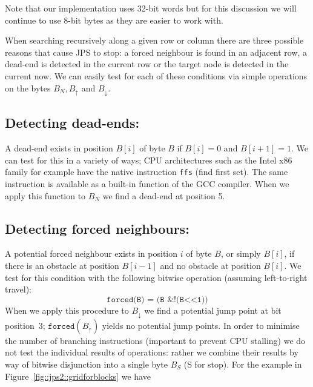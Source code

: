 \noindent Note that our implementation uses 32-bit words but for this discussion
we will continue to use 8-bit bytes as they are easier to work with.  

When searching recursively along a given row or column
there are three possible reasons that cause JPS to stop: 
a forced neighbour is found in an adjacent row, a dead-end is 
detected in the current row or the target node is detected in the
current now.
We can easily test for each of these conditions via simple
operations on the bytes $B_{N}, B_{\uparrow}$ and $B_{\downarrow}$.

\subsection*{Detecting dead-ends:}
A dead-end exists in position $B[i]$ of byte $B$ if $B[i] = 0$ and 
$B[i+1] = 1$. We can test for this in a variety of ways;
CPU architectures such as the Intel x86 family for example have the native 
instruction \texttt{ffs} (find first set). The same instruction is available as
a built-in function of the \textsc{GCC} compiler. When we apply
this function to $B_{N}$ we find a dead-end at position 5.

\subsection*{Detecting forced neighbours:}
A potential forced neighbour exists in position $i$ of byte $B$, or simply 
$B[i]$, if there is an obstacle at position $B[i-1]$ 
and no obstacle at position $B[i]$. We test for this condition with the
following bitwise operation (assuming left-to-right travel):
\begin{equation}
\texttt{forced(B) = (B\ \& !(B<<1))}
\end{equation}
When we apply this procedure to $B_{\downarrow}$ we find a potential jump 
point at bit position~$3$; $\texttt{forced}(B_{\uparrow})$ yields no potential jump points.
In order to minimise the number of branching instructions (important
to prevent CPU stalling) we do not test the individual results of 
operations: rather we combine their results by way
of bitwise disjunction into a single byte $B_{S}$ (S for stop).
For the example in Figure~\ref{fig::jps2::gridforblocks} we have 

